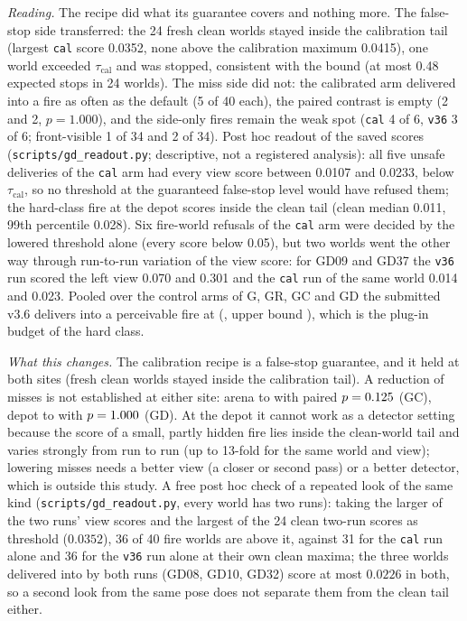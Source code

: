 \documentclass[conference]{IEEEtran}
\begin{document}
\emph{Reading.} The recipe did what its guarantee covers and nothing more. The false-stop side transferred: the 24 fresh clean worlds stayed inside the calibration tail (largest \texttt{cal} score 0.0352, none above the calibration maximum 0.0415), one world exceeded $\tau_{\mathrm{cal}}$ and was stopped, consistent with the bound (at most 0.48 expected stops in 24 worlds). The miss side did not: the calibrated arm delivered into a fire as often as the default (5 of 40 each), the paired contrast is empty (2 and 2, $p=1.000$), and the side-only fires remain the weak spot (\texttt{cal} 4 of 6, \texttt{v36} 3 of 6; front-visible 1 of 34 and 2 of 34). Post hoc readout of the saved scores (\texttt{scripts/gd\_readout.py}; descriptive, not a registered analysis): all five unsafe deliveries of the \texttt{cal} arm had every view score between 0.0107 and 0.0233, below $\tau_{\mathrm{cal}}$, so no threshold at the guaranteed false-stop level would have refused them; the hard-class fire at the depot scores inside the clean tail (clean median 0.011, 99th percentile 0.028). Six fire-world refusals of the \texttt{cal} arm were decided by the lowered threshold alone (every score below 0.05), but two worlds went the other way through run-to-run variation of the view score: for GD09 and GD37 the \texttt{v36} run scored the left view 0.070 and 0.301 and the \texttt{cal} run of the same world 0.014 and 0.023. Pooled over the control arms of G, GR, GC and GD the submitted v3.6 delivers into a perceivable fire at \DepCalPool{} (\DepCalPoolRate{}, upper bound \DepCalPoolUpper), which is the plug-in budget of the hard class.

\emph{What this changes.} The calibration recipe is a false-stop guarantee, and it held at both sites (fresh clean worlds stayed inside the calibration tail). A reduction of misses is not established at either site: arena \GCVThreeSix{} to \GCCal{} with paired $p=0.125$ (GC), depot \DepCalVThreeSix{} to \DepCalCal{} with $p=1.000$ (GD). At the depot it cannot work as a detector setting because the score of a small, partly hidden fire lies inside the clean-world tail and varies strongly from run to run (up to 13-fold for the same world and view); lowering misses needs a better view (a closer or second pass) or a better detector, which is outside this study. A free post hoc check of a repeated look of the same kind (\texttt{scripts/gd\_readout.py}, every world has two runs): taking the larger of the two runs' view scores and the largest of the 24 clean two-run scores as threshold ($0.0352$), 36 of 40 fire worlds are above it, against 31 for the \texttt{cal} run alone and 36 for the \texttt{v36} run alone at their own clean maxima; the three worlds delivered into by both runs (GD08, GD10, GD32) score at most $0.0226$ in both, so a second look from the same pose does not separate them from the clean tail either.
\end{document}
